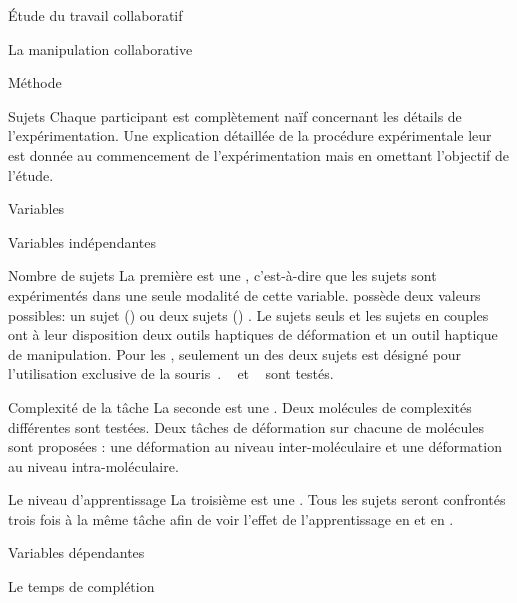 \documentclass[myfrancais]{mythesis}
\begin{document}
\begin{mypart}{Étude du travail collaboratif}
\begin{mychapter}{La manipulation collaborative}
\begin{mysection}{Méthode}
\begin{mysubsection}{Sujets}
					Chaque participant est complètement naïf concernant les détails de l'expérimentation.
					Une explication détaillée de la procédure expérimentale leur est donnée au commencement de l'expérimentation mais en omettant l'objectif de l'étude.
				\end{mysubsection}
				\begin{mysubsection}{Variables}
					\begin{mysubsubsection}{Variables indépendantes}
						\begin{myparagraph}{ Nombre de sujets}
							La première  est une , c'est-à-dire que les sujets sont expérimentés dans une seule modalité de cette variable.
							 possède deux valeurs possibles: \og un sujet (\mycf {}) \fg ou \og deux sujets (\mycf {}) \fg.
							Le sujets seuls et les sujets en couples ont à leur disposition deux outils haptiques de déformation et un outil haptique de manipulation.
							Pour les , seulement un des deux sujets est désigné pour l'utilisation exclusive de la souris~\myThreeD.
							\mynum{12}~ et ~ sont testés.
						\end{myparagraph}
						\begin{myparagraph}{ Complexité de la tâche}
							La seconde  est une .
							Deux molécules de complexités différentes sont testées.
							Deux tâches de déformation sur chacune de molécules sont proposées : une déformation au niveau inter-moléculaire et une déformation au niveau intra-moléculaire.
						\end{myparagraph}
						\begin{myparagraph}{ Le niveau d'apprentissage}
							La troisième  est une .
							Tous les sujets seront confrontés trois fois à la même tâche afin de voir l'effet de l'apprentissage en  et en .
						\end{myparagraph}
					\end{mysubsubsection}
					\begin{mysubsubsection}{Variables dépendantes}
						\begin{myparagraph}{ Le temps de complétion}

\end{myparagraph}
\end{mysubsubsection}
\end{mysubsection}
\end{mysection}
\end{mychapter}
\end{mypart}
\end{document}
